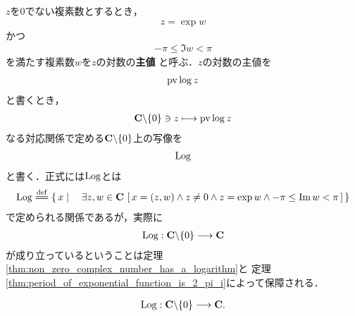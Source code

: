 	$z$を$0$でない複素数とするとき，
	\begin{align}
		z = \exp{w}
	\end{align}
	かつ
	\begin{align}
		-\pi \leq \Im{w} < \pi
	\end{align}
	を満たす複素数$w$を$z$の対数の{\bf 主値}
	と呼ぶ．$z$の対数の主値を
	\begin{align}
		\operatorname{pv}{\log{z}}
	\end{align}
	と書くとき，
	\begin{align}
		\mathbf{C} \backslash \{0\} \ni z \longmapsto \operatorname{pv}{\log{z}}
	\end{align}
	なる対応関係で定める$\mathbf{C} \backslash \{0\}$上の写像を
	\begin{align}
		\operatorname{Log}
	\end{align}
	と書く．正式には$\operatorname{Log}$とは
	\begin{align}
		\pvlog \defeq \Set{x}{\exists z,w \in \C\,
		\left[\, x=(z,w) \wedge z \neq 0 \wedge z = \exp{w} \wedge
		-\pi \leq \Im{w} < \pi\, \right]}
	\end{align}
	で定められる関係であるが，実際に
	\begin{align}
		\operatorname{Log}: \mathbf{C} \backslash \{0\} \longrightarrow \mathbf{C}
	\end{align}
	が成り立っているということは定理\ref{thm:non_zero_complex_number_has_a_logarithm}と
	定理\ref{thm:period_of_exponential_function_is_2_pi_i}によって保障される．
	
	\begin{screen}
		\begin{thm}
			\begin{align}
				\operatorname{Log}: \mathbf{C} \backslash \{0\} \longrightarrow \mathbf{C}.
			\end{align}
		\end{thm}
	\end{screen}
	

